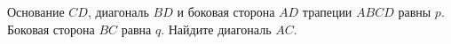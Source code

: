 \begin{ex}
	\begin{condition}
		Основание \( CD \), диагональ \( BD  \) и боковая сторона \( AD \) трапеции \( ABCD  \) равны \( p \). Боковая сторона \( BC  \) равна \( q \). Найдите диагональ \( AC \).
	\end{condition}
\end{ex}